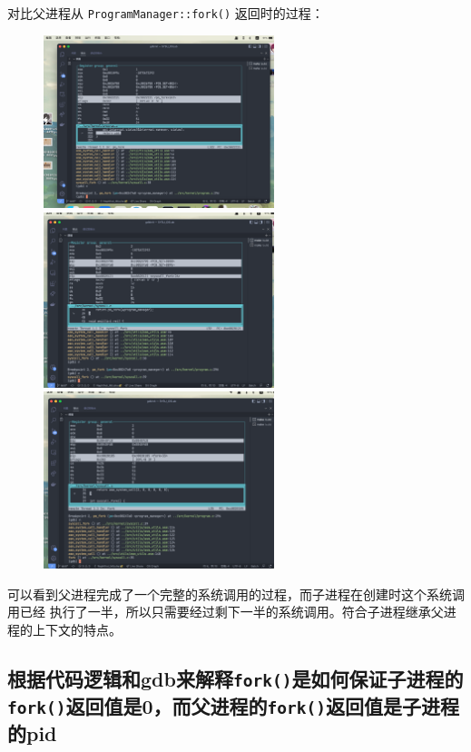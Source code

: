 对比父进程从 \texttt{ProgramManager::fork()} 返回时的过程：

\begin{figure}[H]
    \centering
    \includegraphics[width=0.6\textwidth]{figures/sup0.png}
    \includegraphics[width=0.6\textwidth]{figures/sup1.png}
    \includegraphics[width=0.6\textwidth]{figures/sup2.png}
    \label{sup}
\end{figure}

可以看到父进程完成了一个完整的系统调用的过程，而子进程在创建时这个系统调用已经
执行了一半，所以只需要经过剩下一半的系统调用。符合子进程继承父进程的上下文的特点。

\subsection{根据代码逻辑和gdb来解释\texttt{fork()}是如何保证子进程的\texttt{fork()}返回值是0，而父进程的\texttt{fork()}返回值是子进程的pid}

